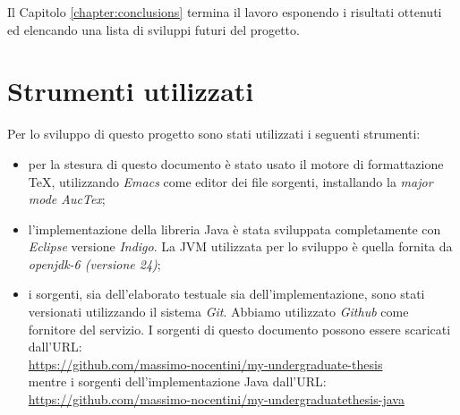 Il Capitolo \ref{chapter:conclusions} termina il lavoro esponendo i
risultati ottenuti ed elencando una lista di sviluppi futuri del
progetto.

\section{Strumenti utilizzati}
Per lo sviluppo di questo progetto sono stati utilizzati i seguenti
strumenti:
\begin{itemize}
\item per la stesura di questo documento \`e stato usato il motore di
  formattazione \TeX, utilizzando \emph{Emacs} come editor dei file
  sorgenti, installando la \emph{major mode AucTex};
\item l'implementazione della libreria Java \`e stata sviluppata
  completamente con \emph{Eclipse} versione \emph{Indigo}. La JVM
  utilizzata per lo sviluppo \`e quella fornita da \emph{openjdk-6
    (versione 24)};
\item i sorgenti, sia dell'elaborato testuale sia
  dell'implementazione, sono stati versionati utilizzando il sistema
  \emph{Git}. Abbiamo utilizzato \emph{Github} come fornitore del
  servizio. I sorgenti di questo documento possono essere scaricati
  dall'URL:\\
  \href{https://github.com/massimo-nocentini/my-undergraduate-thesis}{
    https://github.com/massimo-nocentini/my-undergraduate-thesis}\\
  mentre i sorgenti dell'implementazione Java dall'URL:\\
  \href{https://github.com/massimo-nocentini/my-undergraduatethesis-java}{
    https://github.com/massimo-nocentini/my-undergraduatethesis-java}
\end{itemize}